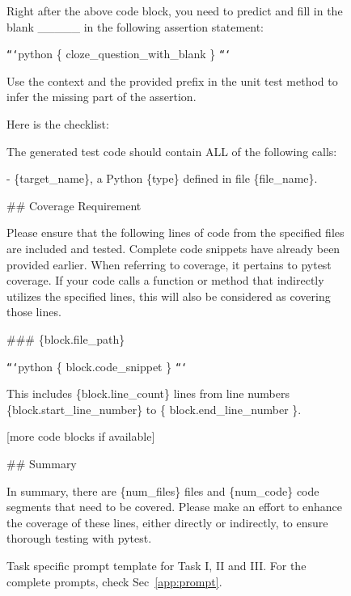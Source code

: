 
\begin{figure}[t]
    \centering
    \scriptsize
    \begin{tcolorbox}[colback=blue!5!white, colframe=blue!40!black, title=Task I, width=\linewidth]
        
Right after the above code block, you need to predict and fill in the blank \_\_\_\_\_ in the following assertion statement:

\texttt{```}python
\{ cloze\_question\_with\_blank \}
\texttt{```}

Use the context and the provided prefix in the unit test method to infer the missing part of the assertion.


    \end{tcolorbox}
    \begin{tcolorbox}[colback=blue!5!white, colframe=blue!40!black, title=Task II, width=\linewidth]

Here is the checklist:
    
    The generated test code should contain ALL of the following calls:
    
    - \{target\_name\}, a Python \{type\} defined in file \{file\_name\}.

\end{tcolorbox}

    \begin{tcolorbox}[colback=blue!5!white, colframe=blue!40!black, title=Task III, width=\linewidth]
\#\# Coverage Requirement

Please ensure that the following lines of code from the specified files are included and tested. Complete code snippets have already been provided earlier. When referring to coverage, it pertains to pytest coverage. If your code calls a function or method that indirectly utilizes the specified lines, this will also be considered as covering those lines.

\#\#\# \{block.file\_path\}

\texttt{```}python
\{ block.code\_snippet \}
\texttt{```}

This includes \{block.line\_count\} lines from line numbers \{block.start\_line\_number\} to \{ block.end\_line\_number \}.

[more code blocks if available]

\#\# Summary

In summary, there are \{num\_files\} files and \{num\_code\} code segments that need to be covered. 
Please make an effort to enhance the coverage of these lines, either directly or indirectly, to ensure thorough testing with pytest.
    \end{tcolorbox}

    \caption{Task specific prompt template for Task I, II and III. For the complete prompts, check Sec~\ref{app:prompt}.}
    \label{fig:prompt_box}
\end{figure}